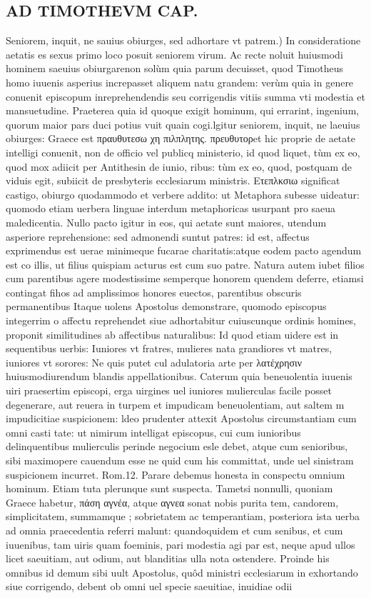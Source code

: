 \documentclass{article}
\begin{document}
\begin{pages}
\section*{AD TIMOTHEVM CAP. }
\marginpar{[ p.103 ]}\pstart Seniorem, inquit, ne sauius obiurges, sed adhortare vt patrem.) In consideratione aetatis es sexus primo loco posuit seniorem virum. Ac recte noluit huiusmodi hominem saeuius obiurgarenon solùm quia parum decuisset, quod Timotheus homo iuuenis asperius increpasset aliquem natu grandem: verùm quia in genere conuenit episcopum inreprehendendis seu corrigendis vitiis summa vti modestia et mansuetudine. Praeterea quia id quoque exigit hominum, qui errarint, ingenium, quorum maior pars duci potius vuit quain cogi.lgitur seniorem, inquit, ne laeuius obiurges: Graece est πραυθυτεσω χη πιλπλητης. πρευθυτορet hic proprie de aetate intelligi conuenit, non de officio vel publicq ministerio, id quod liquet, tùm ex eo, quod mox adiicit per Antithesin de iunio, ribus: tùm ex eo, quod, postquam de viduis egit, subiicit de presbyteris ecclesiarum ministris. Ετεπλκσιω significat castigo, obiurgo quodammodo et verbere addito: ut Metaphora subesse uideatur: quomodo etiam uerbera linguae interdum metaphoricas usurpant pro saeua maledicentia. Nullo pacto igitur in eos, qui aetate sunt maiores, utendum asperiore reprehensione: sed admonendi suntut patres: id est, affectus exprimendus est uerae minimeque fucarae charitatis:atque eodem pacto agendum est co illis, ut filius quispiam acturus est cum suo patre. Natura autem iubet filios cum parentibus agere modestissime semperque honorem quendem deferre, etiamsi contingat fihos ad amplissimos honores euectos, parentibus obscuris permanentibus Itaque uolens Apostolus demonstrare, quomodo episcopus integerrim o affectu reprehendet siue adhortabitur cuiuscunque ordinis homines, proponit similitudines ab affectibus naturalibus: Id quod etiam uidere est in sequentibus uerbis: Iuniores vt fratres, mulieres nata grandiores vt matres, iuniores vt sorores: Ne quis putet cul adulatoria arte per λατέχρησιν huiusmodiurendum blandis appellationibus. Caterum quia beneuolentia iuuenis uiri praesertim episcopi, erga uirgines uel iuniores mulierculas facile posset degenerare, aut reuera in turpem et impudicam beneuolentiam, aut saltem m impudicitiae suspicionem: ldeo prudenter attexit Apostolus circumstantiam cum omni casti tate: ut nimirum intelligat episcopus, cui cum iunioribus delinquentibus mulierculis perinde negocium esle debet, atque cum senioribus, sibi maximopere cauendum esse ne quid cum his committat, unde uel sinistram suspicionem incurret. Rom.12. Parare debemus honesta in conspectu omnium hominum. Etiam tuta plerunque sunt suspecta. Tametsi nonnulli, quoniam Graece habetur, πάση αγνέα, atque αγνεα sonat nobis purita tem, candorem, simplicitatem, summamque ; sobrietatem ac temperantiam, posteriora ista uerba ad omnia praecedentia referri malunt: quandoquidem et cum senibus, et cum iuuenibus, tam uiris quam foeminis, pari modestia agi par est, neque apud ullos licet saeuitiam, aut odium, aut blanditias ulla nota ostendere. Proinde his omnibus id demum sibi uult Apostolus, quôd ministri ecclesiarum in exhortando siue corrigendo, debent ob omni uel specie saeuitiae, inuidiae odii 
\end{pages}
\end{document}
